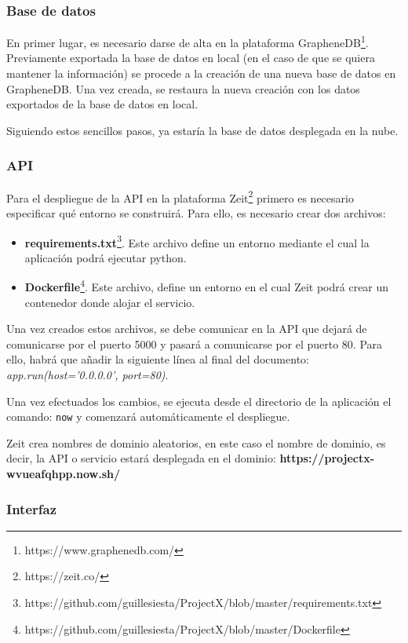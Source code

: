 \subsubsection{Base de datos}
En primer lugar, es necesario darse  de alta en la plataforma GrapheneDB\footnote{https://www.graphenedb.com/}. Previamente exportada la base de datos en local (en el caso de que se quiera mantener la información) se procede a la creación de una nueva base de datos en GrapheneDB. Una vez creada, se restaura la nueva creación con los datos exportados de la base de datos en local\cite{graphenedb}.

Siguiendo estos sencillos pasos, ya estaría la base de datos desplegada en la nube.


\subsubsection{API}

Para el despliegue de la API en la plataforma Zeit\footnote{https://zeit.co/} primero es necesario especificar qué entorno se construirá. Para ello, es necesario crear dos archivos:

\begin{itemize}
    \item \textbf{requirements.txt}\footnote{https://github.com/guillesiesta/ProjectX/blob/master/requirements.txt}. Este archivo define un entorno mediante el cual la aplicación podrá ejecutar python.
    
    \item \textbf{Dockerfile}\footnote{https://github.com/guillesiesta/ProjectX/blob/master/Dockerfile}. Este archivo,  define un entorno en el cual Zeit podrá crear un contenedor donde alojar el servicio.
\end{itemize}

Una vez creados estos archivos, se debe comunicar en la API que dejará de comunicarse por el puerto 5000 y pasará a comunicarse por el puerto 80. Para ello, habrá que añadir la siguiente línea al final del documento: \textit{app.run(host='0.0.0.0', port=80)}.

Una vez efectuados los cambios, se ejecuta desde el directorio de la aplicación el comando: \texttt{now} y comenzará automáticamente el despliegue. 

Zeit crea nombres de dominio aleatorios, en este caso el nombre de dominio, es decir, la API o servicio estará desplegada en el dominio: \textbf{https://projectx-wvueafqhpp.now.sh/}

\subsubsection{Interfaz}

